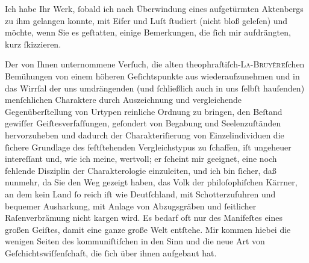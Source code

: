 \pstart
           Ich habe Ihr Werk, ſobald ich
               nach Überwindung eines aufgetürmten Ak{\pb}tenbergs zu ihm gelangen konnte, mit Eifer und Luſt ſtudiert (nicht bloß geleſen)
               und möchte, wenn Sie es geſtatten, einige Bemerkungen, die ſich mir aufdrängten, kurz
               ſkizzieren.\pend
           
\pstart
           Der von Ihnen unternommene Verſuch, die alten theophraſtiſch-\textsc{La-Bruyère}ſchen Bemühungen von einem höheren Geſichtspunkte aus wiederaufzunehmen und in
               das Wirrſal der uns umdrängenden (und ſchließlich auch in uns ſelbſt hauſenden)
               menſchlichen Charaktere durch Auszeichnung und vergleichende Gegenüberſtellung von
               Urtypen reinliche Ordnung zu bringen, den Beſtand gewiſſer Geiſtesverfaſſungen,
               geſondert von Begabung und Seelenzuſtänden hervorzuheben und dadurch der
               Charakteriſierung von Einzelindividuen die ſichere Grundlage des feſtſtehenden
               Vergleichstypus {\pb}zu ſchaffen, iſt
               ungeheuer intereſſant und, wie ich meine, wertvoll; er ſcheint mir geeignet, eine
               noch fehlende Disziplin der Charakterologie einzuleiten, und ich bin ſicher, daß
               nunmehr, da Sie den Weg gezeigt haben, das Volk der philoſophiſchen Kärrner, an dem
               kein Land ſo reich iſt wie Deutſchland, mit
               Schotterzufuhren und bequemer Ausharkung, mit Anlage von Abzugsgräben und ſeitlicher
               Raſenverbrämung nicht kargen wird. Es bedarf oft nur des Manifeſtes \introOben{}\label{T_L02483-1v}\label{T_L02483-1}\introOben{} eines großen Geiſtes, damit eine ganze große Welt entſtehe. Mir kommen hiebei
               die wenigen Seiten des kommuniſtiſchen in den Sinn und  die neue Art von Geſchichtswiſſenſchaft, die ſich über ihnen aufgebaut
               hat.\pend
           
